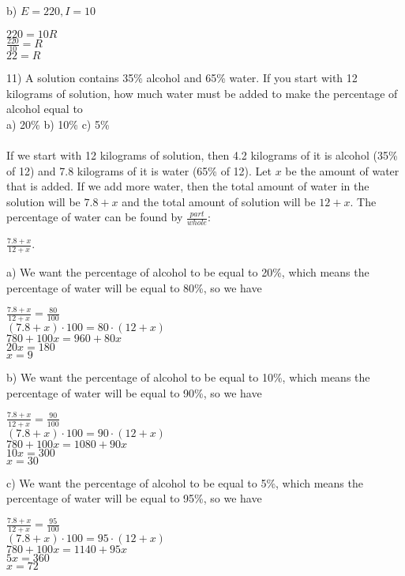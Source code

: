 \documentclass[12pt]{article}
\begin{document}
b) $E=220, I=10$
\begin{center}
$220=10R$ \\
$\displaystyle \frac{220}{10}=R$ \\
$22=R$
\end{center}
11) A solution contains 35\% alcohol and 65\% water. If you start with 12 kilograms of solution, how much water must be added to make the percentage of alcohol equal to \\
a) 20\% \hspace{4cm} b) 10\% \hspace{4cm} c) 5\% \\
\\
If we start with 12 kilograms of solution, then 4.2 kilograms of it is alcohol (35\% of 12) and 7.8 kilograms of it is water (65\% of 12). Let $x$ be the amount of water that is added. If we add more water, then the total amount of water in the solution will be $7.8+x$ and the total amount of solution will be $12+x$. The percentage of water can be found by $\displaystyle \frac{part}{whole}$:
\begin{center}
$\displaystyle \frac{7.8+x}{12+x}$.
\end{center}
a) We want the percentage of alcohol to be equal to 20\%, which means the percentage of water will be equal to 80\%, so we have
\begin{center}
$\displaystyle \frac{7.8+x}{12+x}=\displaystyle \frac{80}{100}$ \\
$(7.8+x)\cdot100=80\cdot(12+x)$ \\
$780+100x=960+80x$ \\
$20x=180$ \\
$x=9$
\end{center}
b) We want the percentage of alcohol to be equal to 10\%, which means the percentage of water will be equal to 90\%, so we have
\begin{center}
$\displaystyle \frac{7.8+x}{12+x}=\displaystyle \frac{90}{100}$ \\
$(7.8+x)\cdot100=90\cdot(12+x)$ \\
$780+100x=1080+90x$ \\
$10x=300$ \\
$x=30$
\end{center}
c) We want the percentage of alcohol to be equal to 5\%, which means the percentage of water will be equal to 95\%, so we have
\begin{center}
$\displaystyle \frac{7.8+x}{12+x}=\displaystyle \frac{95}{100}$ \\
$(7.8+x)\cdot100=95\cdot(12+x)$ \\
$780+100x=1140+95x$ \\
$5x=360$ \\
$x=72$
\end{center}
\end{document}
